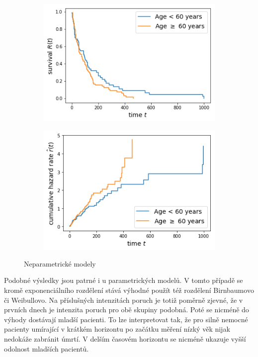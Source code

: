 \documentclass[10pt]{article}
\begin{document}
  \begin{figure}[htb!]
\centering
    \begin{subfigure}{.4\linewidth}
    \centering
    \includegraphics[width=.99\textwidth]{Images/kmage.png}
  \end{subfigure}%
    \begin{subfigure}{.4\linewidth}
    \centering
    \includegraphics[width=.99\textwidth]{Images/naage.png}
  \end{subfigure}%
  \caption{Neparametrické modely}\label{fig:agxxae} 
   \end{figure}
Podobné výsledky jsou patrné i u parametrických modelů. V tomto případě se kromě exponenciálního rozdělení stává výhodné použít též rozdělení Birnbaumovo či Weibullovo. Na příslušných intenzitách poruch je totiž poměrně zjevné, že v prvních dnech je intenzita poruch pro obě skupiny podobná. Poté se nicméně do výhody dostávají mladší pacienti. To lze interpretovat tak, že pro silně nemocné pacienty umírající v krátkém horizontu po začátku měření nízký věk nijak nedokáže zabránit úmrtí. V delším časovém horizontu se nicméně ukazuje vyšší odolnost mladších pacientů.   
\end{document}

